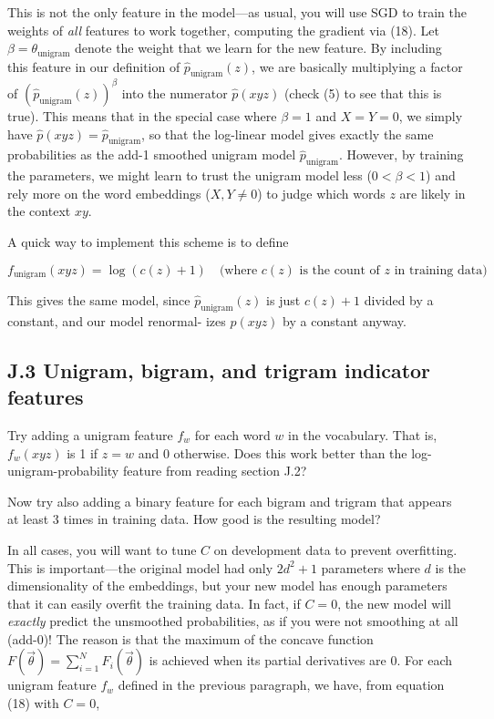 This is not the only feature in the model—as usual, you will use SGD to train the weights of \emph{all} features 
to work together, computing the gradient via (18). Let $\beta = \theta_{\text{unigram}}$ denote the weight that we learn for 
the new feature. By including this feature in our definition of $\hat{p}_{\text{unigram}}(z)$, we are basically multiplying a 
factor of $(\hat{p}_{\text{unigram}}(z))^\beta$ into the numerator $\hat{p}(xyz)$ (check (5) to see that this is true). This means that in the 
special case where $\beta = 1$ and $X = Y = 0$, we simply have $\hat{p}(xyz) = \hat{p}_{\text{unigram}}$, so that the log-linear model 
gives exactly the same probabilities as the add-1 smoothed unigram model $\hat{p}_{\text{unigram}}$. However, by training 
the parameters, we might learn to trust the unigram model less ($0 < \beta < 1$) and rely more on the word 
embeddings ($X, Y \neq 0$) to judge which words $z$ are likely in the context $xy$. 

A quick way to implement this scheme is to define 

\[
f_{\text{unigram}}(xyz) = \log(c(z) + 1) \quad \text{(where $c(z)$ is the count of $z$ in training data)} \tag{27}
\]

This gives the same model, since $\hat{p}_{\text{unigram}}(z)$ is just $c(z)+1$ divided by a constant, and our model renormal-
izes $\hat{p}(xyz)$ by a constant anyway. 

\subsection*{J.3 Unigram, bigram, and trigram indicator features}

Try adding a unigram feature $f_w$ for each word $w$ in the vocabulary. That is, $f_w(xyz)$ is 1 if $z=w$ and 0 
otherwise. Does this work better than the log-unigram-probability feature from reading section J.2? 

Now try also adding a binary feature for each bigram and trigram that appears at least 3 times in training 
data. How good is the resulting model? 

In all cases, you will want to tune $C$ on development data to prevent overfitting. This is important—the 
original model had only $2d^2 + 1$ parameters where $d$ is the dimensionality of the embeddings, but your new 
model has enough parameters that it can easily overfit the training data. In fact, if $C = 0$, the new model 
will \emph{exactly} predict the unsmoothed probabilities, as if you were not smoothing at all (add-0)! The reason 
is that the maximum of the concave function $F(\vec{\theta}) = \sum_{i=1}^N F_i(\vec{\theta})$ is achieved when its partial derivatives 
are 0. For each unigram feature $f_w$ defined in the previous paragraph, we have, from equation (18) with 
$C = 0$, 

